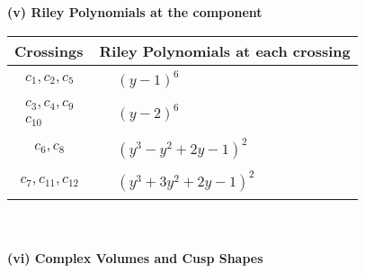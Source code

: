 \documentclass[1p]{elsarticle_modified}
\theoremstyle{definition}
\begin{document}
\newpage\renewcommand{\arraystretch}{1}
\flushleft \textbf{(v) Riley Polynomials at the component}\newline \\
\begin{tabular}{m{50pt}|m{274pt}}
Crossings & \hspace{64pt}Riley Polynomials at each crossing \\
\hline $$\begin{aligned}c_{1},c_{2},c_{5}\end{aligned}$$&$\begin{aligned}
&(y-1)^6
\end{aligned}$\\
\hline $$\begin{aligned}c_{3},c_{4},c_{9}\\c_{10}\end{aligned}$$&$\begin{aligned}
&(y-2)^6
\end{aligned}$\\
\hline $$\begin{aligned}c_{6},c_{8}\end{aligned}$$&$\begin{aligned}
&(y^3- y^2+2 y-1)^2
\end{aligned}$\\
\hline $$\begin{aligned}c_{7},c_{11},c_{12}\end{aligned}$$&$\begin{aligned}
&(y^3+3 y^2+2 y-1)^2
\end{aligned}$\\
\hline
\end{tabular}\\~\\
\newpage\flushleft \textbf{(vi) Complex Volumes and Cusp Shapes}
\end{document}
